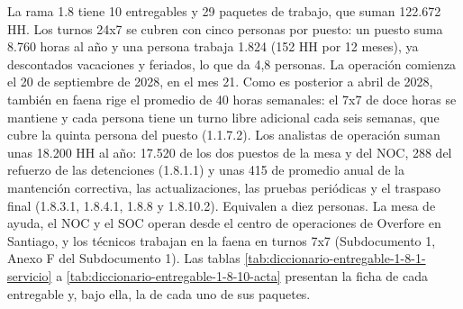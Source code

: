 \documentclass[formulario]{../../comun/overfore}
\begin{document}
La rama 1.8 tiene 10 entregables y 29 paquetes de trabajo, que suman 122.672 HH. Los turnos 24x7 se cubren con cinco personas por puesto: un puesto suma 8.760 horas al año y una persona trabaja 1.824 (152 HH por 12 meses), ya descontados vacaciones y feriados, lo que da 4,8 personas. La operación comienza el 20 de septiembre de 2028, en el mes 21. Como es posterior a abril de 2028, también en faena rige el promedio de 40 horas semanales: el 7x7 de doce horas se mantiene y cada persona tiene un turno libre adicional cada seis semanas, que cubre la quinta persona del puesto (1.1.7.2). Los analistas de operación suman unas 18.200 HH al año: 17.520 de los dos puestos de la mesa y del NOC, 288 del refuerzo de las detenciones (1.8.1.1) y unas 415 de promedio anual de la mantención correctiva, las actualizaciones, las pruebas periódicas y el traspaso final (1.8.3.1, 1.8.4.1, 1.8.8 y 1.8.10.2). Equivalen a diez personas. La mesa de ayuda, el NOC y el SOC operan desde el centro de operaciones de Overfore en Santiago, y los técnicos trabajan en la faena en turnos 7x7 (Subdocumento 1, Anexo F del Subdocumento 1). Las tablas \ref{tab:diccionario-entregable-1-8-1-servicio} a \ref{tab:diccionario-entregable-1-8-10-acta} presentan la ficha de cada entregable y, bajo ella, la de cada uno de sus paquetes.
\end{document}
